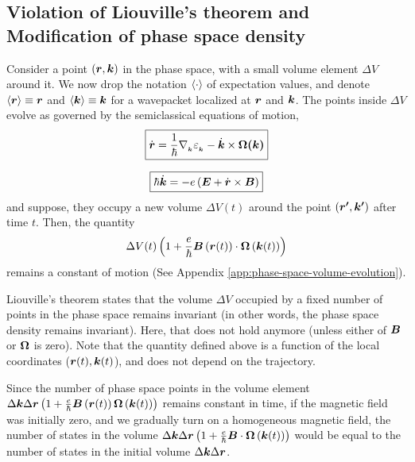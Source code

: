 \documentclass{revtex4-2}
\renewcommand\vec[1]{\ensuremath\boldsymbol{#1}} %
\begin{document}
\subsection{Violation of Liouville's theorem and Modification of phase space density}
Consider a point $\left(\vec{r},\vec{k}\right)$ in the phase space, with a small volume element $\Delta V$ around it. We now drop the notation $\expval{\cdot}$ of expectation values, and denote $\expval{\vec{r}} \equiv \vec{r}$ and $\expval{\vec{k}} \equiv \vec{k}$ for a wavepacket localized at $\vec{r}$ and $\vec{k}$. The points inside $\Delta V$ evolve as governed by the semiclassical equations of motion,
\begin{equation}\label{Eq:evolution-of-R}
	\boxed{\dot{\vec{r}} = \frac{1}{\hbar} \nabla{_{_{\vec{k}}}} \varepsilon_{_{\vec{k}}} - \dot{\vec{k}} \times \vec{\Omega(\vec{k})}}
\end{equation}

\begin{equation}\label{Eq:evolution-of-K}
	\boxed{\hbar \dot{\vec{k}} = -e\left(\vec{E} + \dot{\vec{r}} \times \vec{B} \right)}
\end{equation}
and suppose, they occupy a new volume $\Delta V(t)$ around the point $\left(\vec{r'},\vec{k'}\right)$ after time $t$. Then, the quantity $$\Delta V(t) \left(1 + \frac{e}{\hbar} \vec{B}\left(\vec{r}(t)\right) \cdot  \vec{\Omega}\left(\vec{k}(t)\right)\right)$$ remains a constant of motion (See Appendix \ref{app:phase-space-volume-evolution}).

Liouville's theorem states that the volume $\Delta V$ occupied by a fixed number of points in the phase space remains invariant (in other words, the phase space density remains invariant). Here, that does not hold anymore (unless either of $\vec{B}$ or $\vec{\Omega}$ is zero). Note that the quantity defined above is a function of the local coordinates ($\vec{r}(t), \vec{k}(t)$), and does not depend on the trajectory.

Since the number of phase space points in the volume element $\Delta \vec{k} \Delta \vec{r} \left(1 + \frac{e}{\hbar} \vec{B}\left(\vec{r}(t)\right) \vec{\Omega}\left(\vec{k}(t)\right)\right)$ remains constant in time, if the magnetic field was initially zero, and we gradually turn on a homogeneous magnetic field, the number of states in the volume $\Delta \vec{k} \Delta \vec{r} \left(1 + \frac{e}{\hbar} \vec{B} \cdot \vec{\Omega}\left(\vec{k}(t)\right)\right)$ would be equal to the number of states in the initial volume $\Delta \vec{k} \Delta \vec{r}$.
\end{document}
